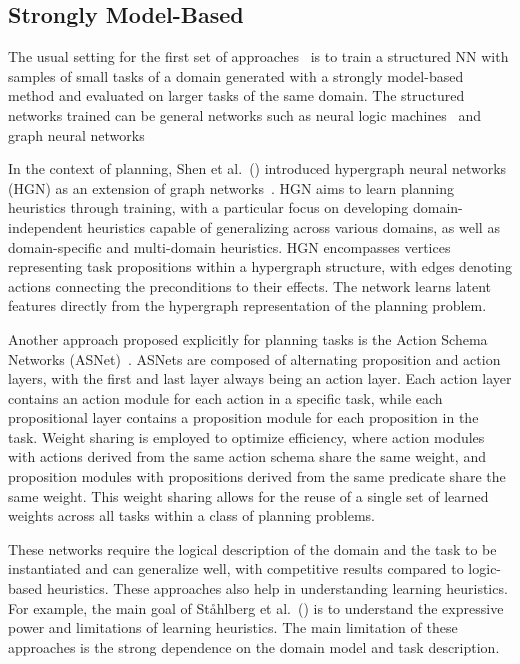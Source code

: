 \subsection{Strongly Model-Based}

The usual setting for the first set of approaches~\cite{Toyer.etal/2018,Shen.etal/2020,Toyer.etal/2020,Gehring.etal/2022,Stahlberg.etal/2022} is to train a structured NN with samples of small tasks of a domain generated with a strongly model-based method and evaluated on larger tasks of the same domain. The structured networks trained can be general networks such as neural logic machines~\cite{Dong.etal/2018} and graph neural networks~\cite{Gori.etal/2005,Scarselli.etal/2008}

In the context of planning, Shen et al.~(\citeyear{Shen.etal/2020}) introduced hypergraph neural networks (HGN) as an extension of graph networks~\cite{Battaglia.etal/2018}. HGN aims to learn planning heuristics through training, with a particular focus on developing domain-independent heuristics capable of generalizing across various domains, as well as domain-specific and multi-domain heuristics. HGN encompasses vertices representing task propositions within a hypergraph structure, with edges denoting actions connecting the preconditions to their effects. The network learns latent features directly from the hypergraph representation of the planning problem.

Another approach proposed explicitly for planning tasks is the Action Schema Networks (ASNet)~\cite{Toyer.etal/2018}. ASNets are composed of alternating proposition and action layers, with the first and last layer always being an action layer. Each action layer contains an action module for each action in a specific task, while each propositional layer contains a proposition module for each proposition in the task. Weight sharing is employed to optimize efficiency, where action modules with actions derived from the same action schema share the same weight, and proposition modules with propositions derived from the same predicate share the same weight. This weight sharing allows for the reuse of a single set of learned weights across all tasks within a class of planning problems.

These networks require the logical description of the domain and the task to be instantiated and can generalize well, with competitive results compared to logic-based heuristics. These approaches also help in understanding learning heuristics. For example, the main goal of St\aa hlberg et al.~(\citeyear{Stahlberg.etal/2022}) is to understand the expressive power and limitations of learning heuristics. The main limitation of these approaches is the strong dependence on the domain model and task description.

